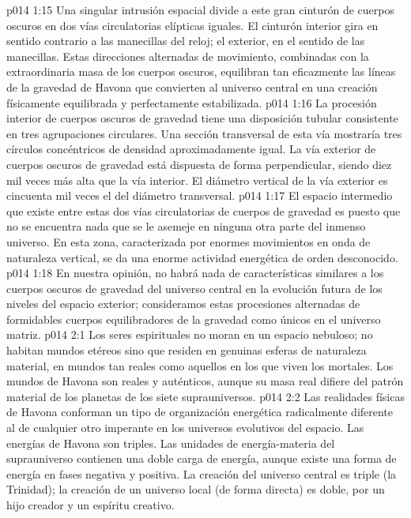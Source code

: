 \vs p014 1:15 Una singular intrusión espacial divide a este gran cinturón de cuerpos oscuros en dos vías circulatorias elípticas iguales. El cinturón interior gira en sentido contrario a las manecillas del reloj; el exterior, en el sentido de las manecillas. Estas direcciones alternadas de movimiento, combinadas con la extraordinaria masa de los cuerpos oscuros, equilibran tan eficazmente las líneas de la gravedad de Havona que convierten al universo central en una creación físicamente equilibrada y perfectamente estabilizada.
\vs p014 1:16 La procesión interior de cuerpos oscuros de gravedad tiene una disposición tubular consistente en tres agrupaciones circulares. Una sección transversal de esta vía mostraría tres círculos concéntricos de densidad aproximadamente igual. La vía exterior de cuerpos oscuros de gravedad está dispuesta de forma perpendicular, siendo diez mil veces más alta que la vía interior. El diámetro vertical de la vía exterior es cincuenta mil veces el del diámetro transversal.
\vs p014 1:17 El espacio intermedio que existe entre estas dos vías circulatorias de cuerpos de gravedad es  puesto que no se encuentra nada que se le asemeje en ninguna otra parte del inmenso universo. En esta zona, caracterizada por enormes movimientos en onda de naturaleza vertical, se da una enorme actividad energética de orden desconocido.
\vs p014 1:18 En nuestra opinión, no habrá nada de características similares a los cuerpos oscuros de gravedad del universo central en la evolución futura de los niveles del espacio exterior; consideramos estas procesiones alternadas de formidables cuerpos equilibradores de la gravedad como únicos en el universo matriz.
\vs p014 2:1 Los seres espirituales no moran en un espacio nebuloso; no habitan mundos etéreos sino que residen en genuinas esferas de naturaleza material, en mundos tan reales como aquellos en los que viven los mortales. Los mundos de Havona son reales y auténticos, aunque su masa real difiere del patrón material de los planetas de los siete suprauniversos.
\vs p014 2:2 Las realidades físicas de Havona conforman un tipo de organización energética radicalmente diferente al de cualquier otro imperante en los universos evolutivos del espacio. Las energías de Havona son triples. Las unidades de energía\hyp{}materia del suprauniverso contienen una doble carga de energía, aunque existe una forma de energía en fases negativa y positiva. La creación del universo central es triple (la Trinidad); la creación de un universo local (de forma directa) es doble, por un hijo creador y un espíritu creativo.
